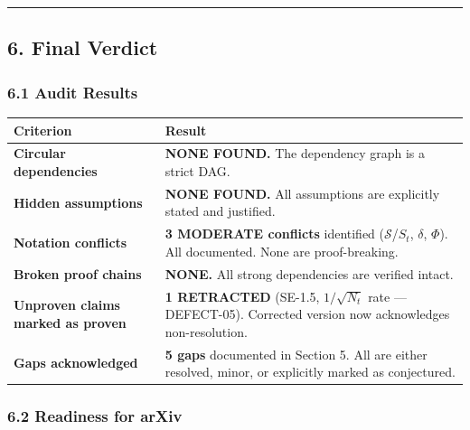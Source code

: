 \documentclass[
  12pt,
]{ctexart}
\begin{document}
\begin{center}\rule{0.5\linewidth}{0.5pt}\end{center}

\subsection{6. Final Verdict}\label{final-verdict}

\subsubsection{6.1 Audit Results}\label{audit-results}

\begin{longtable}[]{@{}
  >{\raggedright\arraybackslash}p{}
  >{\raggedright\arraybackslash}p{}@{}}
\toprule\noalign{}
\begin{minipage}[b]{\linewidth}\raggedright
Criterion
\end{minipage} & \begin{minipage}[b]{\linewidth}\raggedright
Result
\end{minipage} \\
\midrule\noalign{}
\endhead
\bottomrule\noalign{}
\endlastfoot
\textbf{Circular dependencies} & \textbf{NONE FOUND.} The dependency
graph is a strict DAG. \\
\textbf{Hidden assumptions} & \textbf{NONE FOUND.} All assumptions are
explicitly stated and justified. \\
\textbf{Notation conflicts} & \textbf{3 MODERATE conflicts} identified
(\(\mathcal{S}\)/\(S_t\), \(\delta\), \(\Phi\)). All documented. None
are proof-breaking. \\
\textbf{Broken proof chains} & \textbf{NONE.} All strong dependencies
are verified intact. \\
\textbf{Unproven claims marked as proven} & \textbf{1 RETRACTED}
(SE-1.5, \(1/\sqrt{N_t}\) rate --- DEFECT-05). Corrected version now
acknowledges non-resolution. \\
\textbf{Gaps acknowledged} & \textbf{5 gaps} documented in Section 5.
All are either resolved, minor, or explicitly marked as conjectured. \\
\end{longtable}

\subsubsection{6.2 Readiness for arXiv}\label{readiness-for-arxiv}
\end{document}
